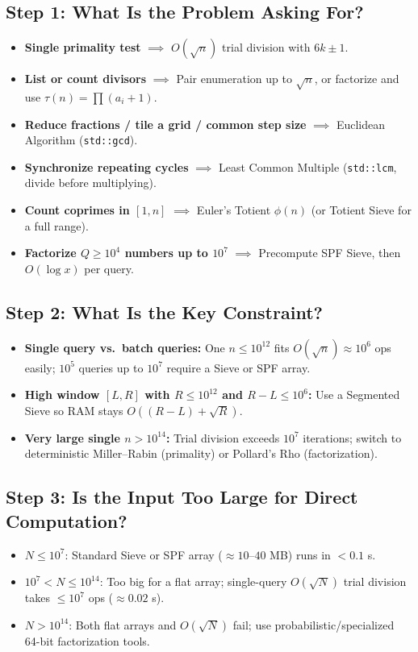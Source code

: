 \documentclass[11pt,a4paper]{article}
\theoremstyle{definition}
\begin{document}
\subsection*{Step 1: What Is the Problem Asking For?}
\begin{itemize}
    \item \textbf{Single primality test} $\implies$ $O(\sqrt{n})$ trial division with $6k \pm 1$.
    \item \textbf{List or count divisors} $\implies$ Pair enumeration up to $\sqrt{n}$, or factorize and use $\tau(n) = \prod(a_i + 1)$.
    \item \textbf{Reduce fractions / tile a grid / common step size} $\implies$ Euclidean Algorithm (\texttt{std::gcd}).
    \item \textbf{Synchronize repeating cycles} $\implies$ Least Common Multiple (\texttt{std::lcm}, divide before multiplying).
    \item \textbf{Count coprimes in $[1, n]$} $\implies$ Euler's Totient $\phi(n)$ (or Totient Sieve for a full range).
    \item \textbf{Factorize $Q \ge 10^4$ numbers up to $10^7$} $\implies$ Precompute SPF Sieve, then $O(\log x)$ per query.
\end{itemize}

\subsection*{Step 2: What Is the Key Constraint?}
\begin{itemize}
    \item \textbf{Single query vs.\ batch queries:} One $n \le 10^{12}$ fits $O(\sqrt{n}) \approx 10^6$ ops easily; $10^5$ queries up to $10^7$ require a Sieve or SPF array.
    \item \textbf{High window $[L, R]$ with $R \le 10^{12}$ and $R - L \le 10^6$:} Use a Segmented Sieve so RAM stays $O((R - L) + \sqrt{R})$.
    \item \textbf{Very large single $n > 10^{14}$:} Trial division exceeds $10^7$ iterations; switch to deterministic Miller--Rabin (primality) or Pollard's Rho (factorization).
\end{itemize}

\subsection*{Step 3: Is the Input Too Large for Direct Computation?}
\begin{itemize}
    \item $N \le 10^7$: Standard Sieve or SPF array ($\approx 10$--$40$ MB) runs in $< 0.1$ s.
    \item $10^7 < N \le 10^{14}$: Too big for a flat array; single-query $O(\sqrt{N})$ trial division takes $\le 10^7$ ops ($\approx 0.02$ s).
    \item $N > 10^{14}$: Both flat arrays and $O(\sqrt{N})$ fail; use probabilistic/specialized 64-bit factorization tools.
\end{itemize}
\end{document}
